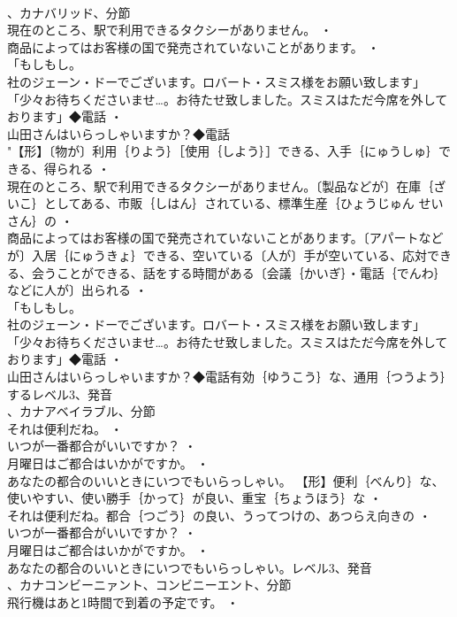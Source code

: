 \documentclass[8pt]{extreport}
\begin{document}
\begin{CJK}{UTF8}{min}
\\	、カナバリッド、分節
\\	現在のところ、駅で利用できるタクシーがありません。 ・
\\	商品によってはお客様の国で発売されていないことがあります。 ・
\\	「もしもし。
\\	社のジェーン・ドーでございます。ロバート・スミス様をお願い致します」「少々お待ちくださいませ…。お待たせ致しました。スミスはただ今席を外しております」◆電話 ・
\\	山田さんはいらっしゃいますか？◆電話
\\	"【形】〔物が〕利用｛りよう｝［使用｛しよう｝］できる、入手｛にゅうしゅ｝できる、得られる ・
\\	現在のところ、駅で利用できるタクシーがありません。〔製品などが〕在庫｛ざいこ｝としてある、市販｛しはん｝されている、標準生産｛ひょうじゅん せいさん｝の ・
\\	商品によってはお客様の国で発売されていないことがあります。〔アパートなどが〕入居｛にゅうきょ｝できる、空いている〔人が〕手が空いている、応対できる、会うことができる、話をする時間がある〔会議｛かいぎ｝・電話｛でんわ｝などに人が〕出られる ・
\\	「もしもし。
\\	社のジェーン・ドーでございます。ロバート・スミス様をお願い致します」「少々お待ちくださいませ…。お待たせ致しました。スミスはただ今席を外しております」◆電話 ・
\\	山田さんはいらっしゃいますか？◆電話有効｛ゆうこう｝な、通用｛つうよう｝するレベル3、発音
\\	、カナアベイラブル、分節
\\	それは便利だね。 ・
\\	いつが一番都合がいいですか？ ・
\\	月曜日はご都合はいかがですか。 ・
\\	あなたの都合のいいときにいつでもいらっしゃい。		【形】便利｛べんり｝な、使いやすい、使い勝手｛かって｝が良い、重宝｛ちょうほう｝な ・
\\	それは便利だね。都合｛つごう｝の良い、うってつけの、あつらえ向きの ・
\\	いつが一番都合がいいですか？ ・
\\	月曜日はご都合はいかがですか。 ・
\\	あなたの都合のいいときにいつでもいらっしゃい。レベル3、発音
\\	、カナコンビーニァント、コンビニーエント、分節
\\	飛行機はあと1時間で到着の予定です。 ・

\end{CJK}
\end{document}
